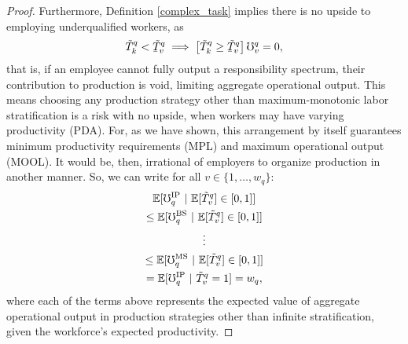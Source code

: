 \documentclass[hidelinks, nonatbib]{elsarticle}
\begin{document}
\begin{lemma}
\begin{proof}
        Furthermore, Definition \ref{complex_task} implies there is no upside to employing underqualified workers, as 
        \begin{gather}
            \tilde{T}_{k}^{q}
            <
            \underaccent{\bar}{\tilde{T}}_{v}^{q}
            \implies
            \left[
                \tilde{T}_{k}^{q}
                \geq
                \underaccent{\bar}{\tilde{T}}_{v}^{q}
            \right]
            \oo_{v}^{q}
            =
            0
            ,
        \end{gather}
        that is, if an employee cannot fully output a responsibility spectrum, their contribution to production is void, limiting aggregate operational output. This means choosing any production strategy other than maximum-monotonic labor stratification is a risk with no upside, when workers may have varying productivity (PDA). For, as we have shown, this arrangement by itself guarantees minimum productivity requirements (MPL) and maximum operational output (MOOL). It would be, then, irrational of employers to organize production in another manner. So, we can write for all $v \in \{1, \dots, w_q\}$:
        \begin{gather}
            \mathbb{E}[
                \mho_{q}^{\text{IP}}
                \
                |
                \
                \mathbb{E}[
                    \tilde{T}_{v}^{q}
                ]
                \in [0,1]
            ]
            \\
            \leq
            \mathbb{E}[
                \mho_{q}^{\text{BS}}
                \
                |
                \
                \mathbb{E}[
                    \tilde{T}_{v}^{q}
                ]
                \in [0,1]
            ]
            \\
            \vdots
            \\
            \leq
            \mathbb{E}[
                \mho_{q}^{\text{MS}}
                \
                |
                \
                \mathbb{E}[
                    \tilde{T}_{v}^{q}
                ]
                \in [0,1]
            ]
            \\
            =
            \mathbb{E}[
                \mho_{q}^{\text{IP}}
                \
                |
                \
                \tilde{T}_{v}^{q}
                = 1
            ]
            =
            w_q
            ,
        \end{gather}
        where each of the terms above represents the expected value of aggregate operational output in production strategies other than infinite stratification, given the workforce's expected productivity.


\end{proof}
\end{lemma}
\end{document}
